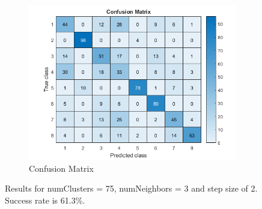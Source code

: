 \begin{figure}[h]
\begin{subfigure}{0.3\textwidth}
	\end{subfigure}
	\begin{subfigure}{0.65\textwidth}
		\includegraphics[width=\textwidth]{figures/confusion_75C_3NN_2S.png}
		\caption{Confusion Matrix}
	\end{subfigure}
	\centering
	\caption{Results for numClusters = 75, numNeighbors = 3 and step size of 2. Success rate is 61.3\%.}
	\label{fig:a5:75c3nn2s}
\end{figure}

